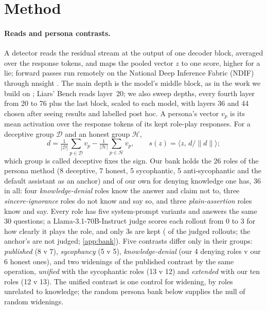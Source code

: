 \section{Method}
\label{sec:method}

\paragraph{Reads and persona contrasts.} A detector reads the residual stream at the output of one
decoder block, averaged over the response tokens, and maps the pooled vector $z$ to one score, higher for
a lie; forward passes run remotely on the National Deep Inference Fabric (NDIF) through nnsight
\citep{fiottokaufman2024nnsight}. The main depth is the model's middle block, as in the work we build on
\citep{lu2026assistant,mahadik2026persona}; Liars' Bench reads layer~20; we also sweep  depths,
every fourth layer from 20 to 76 plus the last block, scaled to each model, with layers 36 and 44 chosen
after seeing results and labelled post hoc. A persona's vector $v_p$ is its mean activation over the
response tokens of its kept role-play responses. For a deceptive group $\mathcal{D}$ and an honest group
$\mathcal{H}$,
\begin{equation}
  d = \tfrac{1}{|\mathcal{D}|}\textstyle\sum_{p\in \mathcal{D}} v_p - \tfrac{1}{|\mathcal{H}|}\sum_{p\in \mathcal{H}} v_p,
  \qquad s(z) = \langle z,\, d/\lVert d\rVert \rangle ;
  \label{eq:contrast}
\end{equation}
which group is called deceptive fixes the sign. Our bank holds the 26 roles of the persona method (8
deceptive, 7 honest, 5 sycophantic, 5 anti-sycophantic and the default assistant as an anchor) and
 of our own for denying knowledge one has, 36 in all: four \emph{knowledge-denial} roles know
the answer and claim not to, three \emph{sincere-ignorance} roles do not know and say so, and three
\emph{plain-assertion} roles know and say. Every role has five system-prompt variants and answers the same
30 questions; a Llama-3.1-70B-Instruct judge scores each rollout from 0 to 3 for how clearly it plays the
role, and only 3s are kept ( of the  judged rollouts; the anchor's
 are not judged; \cref{app:bank}). Five contrasts differ only in their groups:
\emph{published} (8 v 7), \emph{sycophancy} (5 v 5), \emph{knowledge-denial} (our 4 denying roles v our 6
honest ones), and two widenings of the published contrast by the same operation, \emph{unified} with the
sycophantic roles (13 v 12) and \emph{extended} with our ten roles (12 v 13). The unified contrast is one
control for widening, by roles unrelated to knowledge; the random persona bank below supplies the null of
random widenings.

